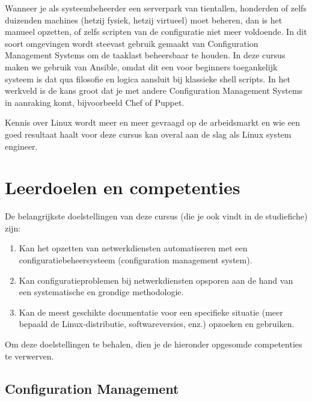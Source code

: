 Wanneer je als systeembeheerder een serverpark van tientallen, honderden of zelfs duizenden machines (hetzij fysiek, hetzij virtueel) moet beheren, dan is het manueel opzetten, of zelfs scripten van de configuratie niet meer voldoende. In dit soort omgevingen wordt steevast gebruik gemaakt van Configuration Management Systems om de taaklast beheersbaar te houden. In deze cursus maken we gebruik van Ansible, omdat dit een voor beginners toegankelijk systeem is dat qua filosofie en logica aansluit bij klassieke shell scripts. In het werkveld is de kans groot dat je met andere Configuration Management Systems in aanraking komt, bijvoorbeeld Chef of Puppet.

Kennis over Linux wordt meer en meer gevraagd op de arbeidsmarkt en wie een goed resultaat haalt voor deze cursus kan overal aan de slag als Linux system engineer.

\section{Leerdoelen en competenties}
\label{sec:leerdoelen}

De belangrijkste doelstellingen van deze cursus (die je ook vindt in de studiefiche) zijn:

\begin{enumerate}
  \item Kan het opzetten van netwerkdiensten automatiseren met een configuratiebeheersysteem (configuration management system).
  \item Kan configuratieproblemen bij netwerkdiensten opsporen aan de hand van een systematische en grondige methodologie.
  \item Kan de meest geschikte documentatie voor een specifieke situatie (meer bepaald de Linux-distributie, softwareversies, enz.) opzoeken en gebruiken.
\end{enumerate}

Om deze doelstellingen te behalen, dien je de hieronder opgesomde competenties te verwerven.

\subsection{Configuration Management}
\label{ssec:config-mgmt}


